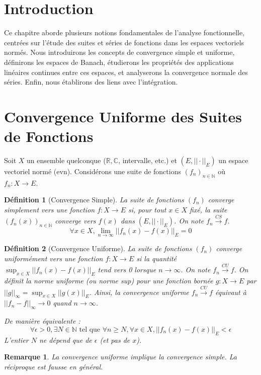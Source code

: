 \documentclass{article}
\newtheorem{definition}{Définition}
\newtheorem{remark}{Remarque}
\begin{document}
\sloppy

\section{Introduction}
Ce chapitre aborde plusieurs notions fondamentales de l'analyse fonctionnelle, centrées sur l'étude des suites et séries de fonctions dans les espaces vectoriels normés. Nous introduirons les concepts de convergence simple et uniforme, définirons les espaces de Banach, étudierons les propriétés des applications linéaires continues entre ces espaces, et analyserons la convergence normale des séries. Enfin, nous établirons des liens avec l'intégration.

\section{Convergence Uniforme des Suites de Fonctions}

Soit $X$ un ensemble quelconque ($\mathbb{R}, \mathbb{C}$, intervalle, etc.) et $(E, ||\cdot||_E)$ un espace vectoriel normé (evn). Considérons une suite de fonctions $(f_n)_{n\in\mathbb{N}}$ où $f_n: X \to E$.

\begin{definition}[Convergence Simple]
La suite de fonctions $(f_n)$ converge simplement vers une fonction $f: X \to E$ si, pour tout $x \in X$ fixé, la suite $(f_n(x))_{n\in\mathbb{N}}$ converge vers $f(x)$ dans $(E, ||\cdot||_E)$. On note $f_n \xrightarrow{CS} f$.
\[
\forall x \in X, \lim_{n \to \infty} ||f_n(x) - f(x)||_E = 0
\]
\end{definition}

\begin{definition}[Convergence Uniforme]
La suite de fonctions $(f_n)$ converge uniformément vers une fonction $f: X \to E$ si la quantité $\sup_{x \in X} ||f_n(x) - f(x)||_E$ tend vers 0 lorsque $n \to \infty$. On note $f_n \xrightarrow{CU} f$.
On définit la norme uniforme (ou norme sup) pour une fonction bornée $g: X \to E$ par $||g||_\infty = \sup_{x \in X} ||g(x)||_E$.
Ainsi, la convergence uniforme $f_n \xrightarrow{CU} f$ équivaut à $||f_n - f||_\infty \to 0$ quand $n \to \infty$.

De manière équivalente :
\[
\forall \epsilon > 0, \exists N \in \mathbb{N} \text{ tel que } \forall n \ge N, \forall x \in X, ||f_n(x) - f(x)||_E < \epsilon
\]
L'entier $N$ ne dépend que de $\epsilon$ (et pas de $x$).
\end{definition}

\begin{remark}
La convergence uniforme implique la convergence simple. La réciproque est fausse en général.
\end{remark}
\end{document}

